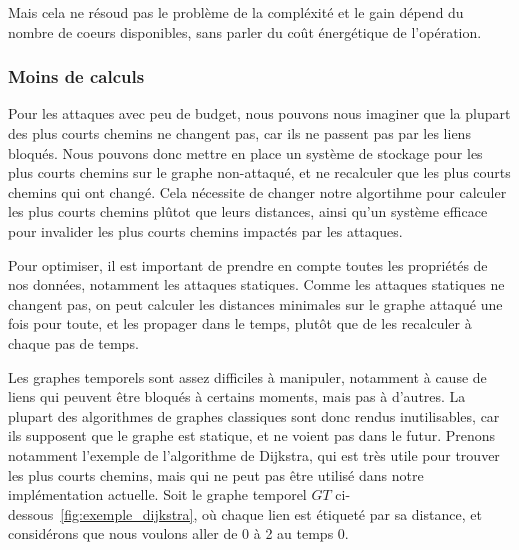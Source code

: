 \bigskip
Mais cela ne résoud pas le problème de la compléxité et le gain dépend du nombre de coeurs disponibles, sans parler du coût énergétique de l'opération.

\subsubsection{Moins de calculs}\label{subsubsec:moins_de_calculs}

\label{subsubsubsec:cache}
Pour les attaques avec peu de budget, nous pouvons nous imaginer que la plupart des plus courts chemins ne changent pas, car ils ne passent pas par les liens bloqués.
Nous pouvons donc mettre en place un système de stockage pour les plus courts chemins sur le graphe non-attaqué, et ne recalculer que les plus courts chemins qui ont changé.
Cela nécessite de changer notre algortihme pour calculer les plus courts chemins plûtot que leurs distances, ainsi qu'un système efficace pour invalider les plus courts chemins impactés par les attaques.

\label{subsubsubsec:proprietes_attaques_statiques}
Pour optimiser, il est important de prendre en compte toutes les propriétés de nos données, notamment les attaques statiques.
Comme les attaques statiques ne changent pas, on peut calculer les distances minimales sur le graphe attaqué une fois pour toute, et les propager dans le temps, plutôt que de les recalculer à chaque pas de temps.

\label{subsubsubsec:structure_de_donnees_opti}
Les graphes temporels sont assez difficiles à manipuler, notamment à cause de liens qui peuvent être bloqués à certains moments, mais pas à d'autres.
La plupart des algorithmes de graphes classiques sont donc rendus inutilisables, car ils supposent que le graphe est statique, et ne voient pas dans le futur.
Prenons notamment l'exemple de l'algorithme de Dijkstra, qui est très utile pour trouver les plus courts chemins, mais qui ne peut pas être utilisé dans notre implémentation actuelle.
Soit le graphe temporel $GT$ ci-dessous~\ref{fig:exemple_dijkstra}, où chaque lien est étiqueté par sa distance, et considérons que nous voulons aller de 0 à 2 au temps 0.

